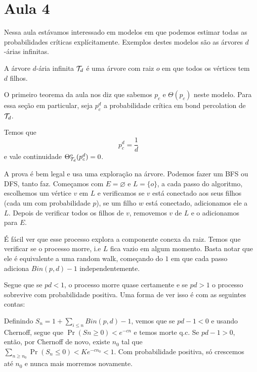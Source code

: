 \section{Aula 4}

Nessa aula estávamos interessado em modelos em que podemos
estimar todas as probabilidades críticas explícitamente.
Exemplos destes modelos são as árvores $d$-árias infinitas.

\begin{definition}
	A árvore $d$-ária infinita $\mathcal{T}_d$ é uma árvore com raiz $o$ em que
	todos os vértices tem $d$ filhos.
\end{definition}

O primeiro teorema da aula nos diz que sabemos $p_c$ e $\Theta(p_c)$
neste modelo.
Para essa seção em particular, seja $p_c^d$ a probabilidade crítica
em bond percolation de $\mathcal{T}_d$.
\begin{theorem}
	Temos que
	\begin{equation}
		p_c^d = \frac{1}{d}
	\end{equation}
	e vale continuidade $\Theta_{\mathcal{T}_d}^o(p_c^d) = 0$.
\end{theorem}

A prova é bem legal e usa uma exploração na árvore. Podemos fazer um
BFS ou DFS, tanto faz. Começamos
com $E = \varnothing$ e $L = \{o\}$, a cada passo do algoritmo,
escolhemos um vértice $v$ em $L$ e verificamos
se $v$ está conectado aos seus filhos (cada um com probabilidade $p$),
se um filho $w$ está conectado, adicionamos ele a $L$.
Depois de verificar todos os filhos de $v$, removemos $v$ de $L$ e o
adicionamos para $E$.

É fácil ver que esse processo explora a componente conexa da raiz.
Temos que verificar se o processo morre, i.e $L$ fica vazio em algum
momento. Basta notar que ele é equivalente a uma random walk,
começando do $1$ em que cada passo adiciona $Bin(p,d) - 1$ independentemente.

Segue que se $pd < 1$, o processo morre quase certamente e se $pd >
1$ o processo sobrevive com probabilidade positiva. Uma forma de ver isso
é com as seguintes contas:

Definindo $S_n = 1 + \sum_{i \leq n} Bin(p,d) - 1$, vemos que se $pd
- 1 < 0$ e usando Chernoff, segue que $\Pr(Sn \geq 0) < e^{-cn}$ e temos
morte q.c. Se $pd - 1 > 0$, então, por Chernoff de novo, existe $n_0$
tal que $\sum_{n \geq n_0} \Pr(S_n \leq 0) < Ke^{-cn_0} <1$.
Com probabilidade positiva, só crescemos até $n_0$ e nunca mais
morremos novamente.

